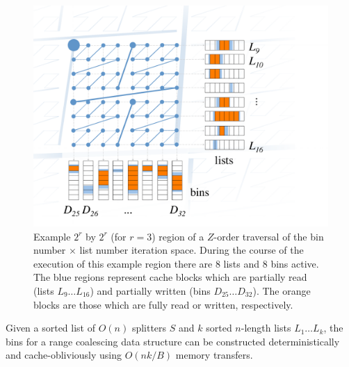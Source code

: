 \begin{figure}[h]
\includegraphics[scale=.35]{bin-construction.pdf}
\caption{Example $2^r$ by $2^r$ (for $r=3$) region of a $Z$-order traversal of 
the bin number $\times$ list number iteration space.  During the course of the
execution of this example region there are $8$ lists and $8$ 
bins active.  The blue regions represent cache blocks which
are partially read (lists $L_9 \ldots L_{16}$) and partially written 
(bins $D_{25} \ldots D_{32}$).  The orange blocks are those which are fully read or 
written, respectively.}
\label{fig:range_coalescing} 
\end{figure}


\begin{theorem}
Given a sorted list of $O(n)$ splitters $S$ and $k$ sorted $n$-length lists 
$L_1 \ldots L_k$, the bins for a range coalescing data structure can be constructed
deterministically and cache-obliviously using $O(nk/B)$ memory transfers.
\end{theorem}

